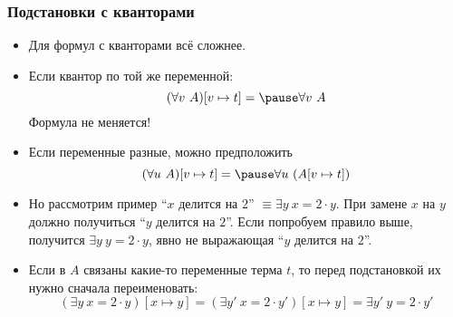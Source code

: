 \documentclass[10pt]{beamer}
\begin{document}
\begin{frame}
    \frametitle{Подстановки с кванторами}
    \begin{itemize}
        \item Для формул с кванторами всё сложнее.
        \item Если квантор по той же переменной:
        \[ (\forall v ~ A)[v \mapsto t] = \pause \forall v ~ A \]
        Формула не меняется!
        \pause
        \item Если переменные разные, можно предположить 
        \[ (\forall u ~ A)[v \mapsto t] = \pause \forall u ~ (A[v \mapsto t]) \]
        \pause
        \vspace{-1.5em}
        \item Но рассмотрим пример
        \enquote{$x$ делится на $2$} $\equiv \exists y ~ x = 2 \cdot y$. При замене $x$ на $y$ должно получиться \pause \enquote{$y$ делится на $2$}. Если попробуем правило выше, получится \pause $\exists y ~ y = 2 \cdot y$, \pause явно не выражающая \enquote{$y$ делится на $2$}.
        \item Если в $A$ связаны какие-то переменные терма $t$, то перед подстановкой их нужно сначала переименовать: 
        \[ (\exists y ~ x = 2 \cdot y)[x \mapsto y] = (\exists y' ~ x = 2 \cdot y')[x \mapsto y] = \exists y' ~ y = 2 \cdot y' \]
    \end{itemize}
\end{frame}
\end{document}
